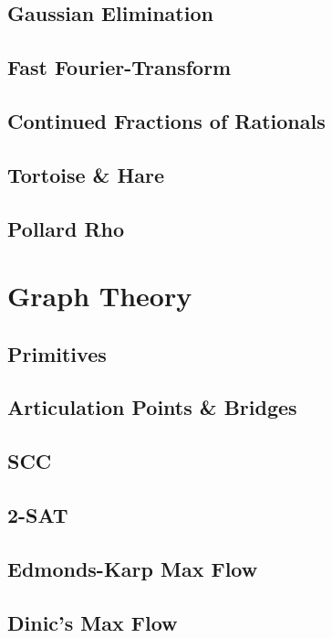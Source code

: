 		\subsection{Gaussian Elimination}
			
		\subsection{Fast Fourier-Transform}
			
		\subsection{Continued Fractions of Rationals}
			
		\subsection{Tortoise \& Hare}
			
		\subsection{Pollard Rho}
			
	\section{Graph Theory}
		\subsection{Primitives}
			
		\subsection{Articulation Points \& Bridges}
			
		\subsection{SCC}
			
		\subsection{2-SAT}
			
		\subsection{Edmonds-Karp Max Flow}
			
		\subsection{Dinic's Max Flow}
			
